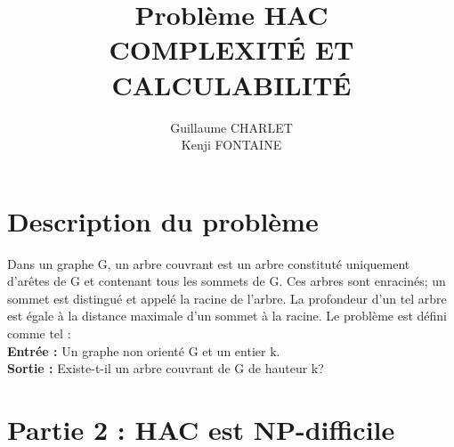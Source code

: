 \documentclass[a4paper]{article}
\title
{
	\LARGE{Problème HAC}
	\HRule \\ [0.5cm]
	\LARGE \textbf{\uppercase{Complexité et Calculabilité}}
	\HRule \\ [0.5cm]
}
\author{Guillaume CHARLET \\ Kenji FONTAINE}
\begin{document}
\null  %
\nointerlineskip  %
\vfill
\let\snewpage \newpage
\let\newpage \relax
\maketitle
\let \newpage \snewpage
\vfill
\break %


\tableofcontents
\newpage


\section{Description du problème}
Dans un graphe G, un arbre couvrant est un arbre constituté uniquement d'arêtes de G et contenant tous les sommets de G. Ces arbres sont enracinés; un sommet est distingué et appelé la racine de l'arbre. La profondeur d'un tel arbre est égale à la distance maximale d'un sommet à la racine. Le problème est défini comme tel : \\
\textbf{Entrée :} Un graphe non orienté G et un entier k. \\
\textbf{Sortie :} Existe-t-il un arbre couvrant de G de hauteur k?


\section{Partie 2 : HAC est NP-difficile}
\end{document}
